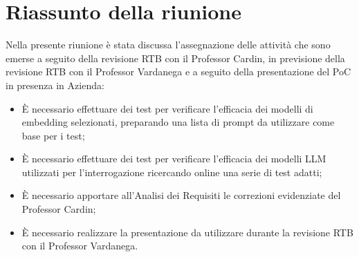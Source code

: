 \section{Riassunto della riunione}
Nella presente riunione è stata discussa l'assegnazione delle attività che sono emerse a seguito della revisione RTB con il Professor Cardin, in previsione della revisione RTB con il Professor Vardanega e a seguito della presentazione del PoC in presenza in Azienda:
\begin{itemize}
    \item \`E necessario effettuare dei test per verificare l'efficacia dei modelli di embedding selezionati, preparando una lista di prompt da utilizzare come base per i test;
    \item \`E necessario effettuare dei test per verificare l'efficacia dei modelli LLM utilizzati per l'interrogazione ricercando online una serie di test adatti; 
    \item \`E necessario apportare all'Analisi dei Requisiti le correzioni evidenziate del Professor Cardin;
    \item \`E necessario realizzare la presentazione da utilizzare durante la revisione RTB con il Professor Vardanega.
\end{itemize}